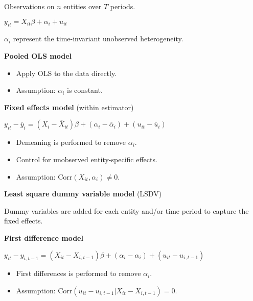 \documentclass[10pt, a4paper, landscape]{article}
\newcommand{\Corr}{\mathrm{Corr}}
\begin{document}
\begin{multicols}{3}
		Observations on $n$ entities over $T$ periods.
						
		\begin{center}
			$y_{it} = X_{it} \beta + \alpha_{i} + u_{it}$
		\end{center}
		
		$\alpha_{i}$ represent the time-invariant unobserved heterogeneity.
		
		\textbf{Pooled OLS model}
		
		\begin{itemize}[leftmargin=*]
			\item Apply OLS to the data directly.
			\item Assumption: $\alpha_i$ is constant.
		\end{itemize}
		
		\textbf{Fixed effects model} (within estimator)
		
		\begin{center}
			$y_{it} - \overline{y}_{i} = (X_{i} - \overline{X}_{it}) \beta + (\alpha_{i} - \overline{\alpha}_i) + (u_{it} - \overline{u}_{i})$
		\end{center}
		
		\begin{itemize}[leftmargin=*]
			\item Demeaning is performed to remove $\alpha_i$.
			\item Control for unobserved entity-specific effects.
			\item Assumption: $\Corr(X_{it}, \alpha_i) \neq 0$.
		\end{itemize}
		
		\textbf{Least square dummy variable model} (LSDV)
		
		Dummy variables are added for each entity and/or time period to capture the fixed effects.
		
		\textbf{First difference model}
		
		\begin{center}
			$y_{it} - y_{i,t-1} = (X_{it} - X_{i,t-1}) \beta + (\alpha_{i} - \alpha_i) + (u_{it} - u_{i,t-1})$
		\end{center}
		
		\begin{itemize}[leftmargin=*]
			\item First differences is performed to remove $\alpha_i$.
			\item Assumption: $\Corr(u_{it} - u_{i,t-1} | X_{it} - X_{i,t-1}) = 0$.
		\end{itemize}
		

\end{multicols}
\end{document}
